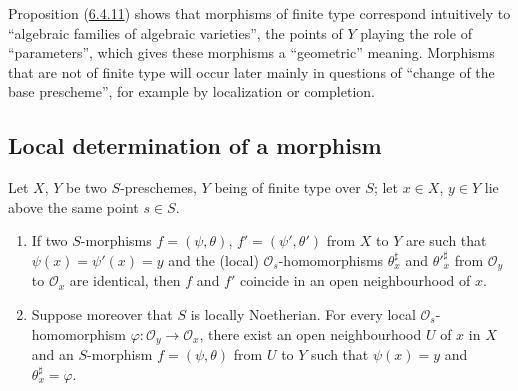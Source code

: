 \begin{env}[6.4.13]
\label{I.6.4.13}
Proposition (\hyperref[I.6.4.11]{6.4.11}) shows that morphisms of finite
type correspond intuitively to ``algebraic families of algebraic
varieties'', the points of $Y$ playing
the role of ``parameters'', which gives these morphisms a
``geometric'' meaning. Morphisms that are not of finite type will occur
later mainly in questions of ``change of the base prescheme'', for
example by localization or completion.
\end{env}


\subsection{Local determination of a morphism}
\label{subsection:I.6.5}

\begin{proposition}[6.5.1]
\label{I.6.5.1}
Let $X$, $Y$ be two $S$-preschemes, $Y$ being of finite type over $S$; let
$x\in X$, $y\in Y$ lie above the same point $s\in S$.
\begin{enumerate}
  \item[(i)] If two $S$-morphisms $f=(\psi,\theta)$,
    $f'=(\psi',\theta')$ from $X$ to $Y$ are such that
    $\psi(x)=\psi'(x)=y$ and the (local) $\mathscr{O}_s$-homomorphisms
    $\theta_x^\sharp$ and ${\theta'}_x^\sharp$ from $\mathscr{O}_y$ to
    $\mathscr{O}_x$ are identical, then $f$ and $f'$ coincide in an open
    neighbourhood of $x$.
  \item[(ii)] Suppose moreover that $S$ is locally Noetherian. For every local
    $\mathscr{O}_s$-homomorphism
    $\varphi:\mathscr{O}_y\to\mathscr{O}_x$, there exist an open neighbourhood
    $U$ of $x$ in $X$ and an $S$-morphism $f=(\psi,\theta)$ from $U$ to $Y$
    such that $\psi(x)=y$ and $\theta_x^\sharp=\varphi$.
\end{enumerate}
\end{proposition}

